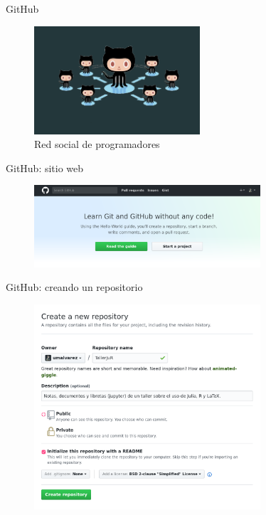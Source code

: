\documentclass{beamer}
\begin{document}
\begin{frame}[standout]
  GitHub
  \begin{figure}[b]
    \centering
    \includegraphics[width=0.55\textwidth]{fig/gitSocial}
    \caption{Red social de programadores}
    \label{fig:gitscii}
  \end{figure}
\end{frame}

\begin{frame}{GitHub: sitio web}
  \begin{figure}[hp]
    \centering \includegraphics[width=0.75\textwidth]{fig/00start}
    \label{fig:githw}
  \end{figure}
\end{frame}

\begin{frame}{GitHub: creando un repositorio}
  \begin{figure}[hp]
    \centering \includegraphics[width=0.75\textwidth]{fig/01newRepo}
    \label{fig:githNr}
  \end{figure}
\end{frame}
\end{document}
